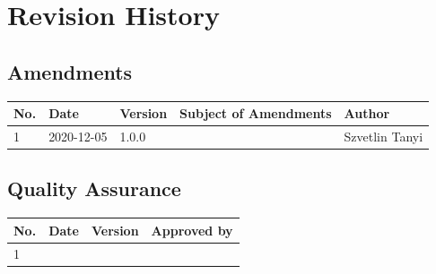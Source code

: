 \documentclass[a4paper]{arrowhead}
\begin{document}
\newpage




\newpage

\section{Revision History}
\subsection{Amendments}

\noindent\begin{tabularx}{\textwidth}{| p{1cm} | p{3cm} | p{2cm} | X | p{4cm} |} \hline
\rowcolor{gray!33} No. & Date & Version & Subject of Amendments & Author \\ \hline

1 & 2020-12-05 & 1.0.0 & & Szvetlin Tanyi \\ \hline

\end{tabularx}

\subsection{Quality Assurance}

\noindent\begin{tabularx}{\textwidth}{| p{1cm} | p{3cm} | p{2cm} | X |} \hline
\rowcolor{gray!33} No. & Date & Version & Approved by \\ \hline

1 & & & \\ \hline

\end{tabularx}
\end{document}

